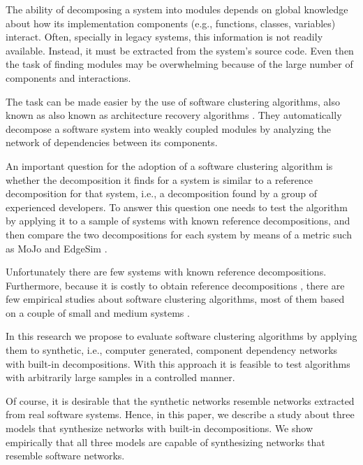 The ability of decomposing a system into modules depends on global knowledge
about how its implementation components (e.g., functions, classes, variables)
interact. Often, specially in legacy systems, this information is not readily
available. Instead, it must be extracted from the system's source code. Even
then the task of finding modules may be overwhelming because of the large number
of components and interactions.

The task can be made easier by the use of software clustering algorithms, also
known as also known as architecture recovery algorithms \cite{Pollet2007}. They
automatically decompose a software system into weakly coupled modules by
analyzing the network of dependencies between its components.


An important question for the adoption of a software clustering algorithm is
whether the decomposition it finds for a system is similar to a reference
decomposition for that system, i.e., a decomposition found by a group of
experienced developers. To answer this question one needs to test the algorithm
by applying it to a sample of systems with known reference decompositions, and
then compare the two decompositions for each system by means of a metric such as
MoJo \cite{Tzerpos1999} and EdgeSim \cite{Mitchell2001}.

Unfortunately there are few systems with known reference decompositions.
Furthermore, because it is costly to obtain reference decompositions
\cite{Koschke2000}, there are few empirical studies about software clustering
algorithms, most of them based on a couple of small and medium systems
\cite{Anquetil1999,Maqbool2007,Bittencourt2009}.


In this research we propose to evaluate software clustering algorithms by
applying them to synthetic, i.e., computer generated, component dependency
networks with built-in decompositions. With this approach it is feasible to test
algorithms with arbitrarily large samples in a controlled manner.

Of course, it is desirable that the synthetic networks resemble networks
extracted from real software systems. Hence, in this paper, we describe a study
about three models that synthesize networks with built-in decompositions. We
show empirically that all three models are capable of synthesizing networks that
resemble software networks.


